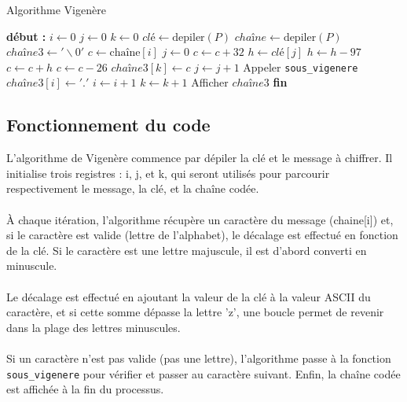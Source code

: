 \documentclass[a4paper, 12pt]{article}
\begin{document}
\begin{algorithm}
\caption{Algorithme Vigenère}
\begin{algorithmic}[1]
\State \textbf{début :}
\State $i \gets 0$
\State $j \gets 0$
\State $k \gets 0$
\State $clé \gets \text{depiler}(P)$
\State $chaîne \gets \text{depiler}(P)$
\State $chaîne3 \gets '\backslash 0'$ 
    \State $c \gets \text{chaîne}[i]$
        \State $j \gets 0$ 
    \EndIf
        \State $c \gets c + 32$ 
    \EndIf
        \State $h \gets clé[j]$
        \State $h \gets h - 97$ 
        \State $c \gets c + h$
            \State $c \gets c - 26$ 
        \EndWhile
        \State $chaîne3[k] \gets c$
        \State $j \gets j + 1$
    \Else
        \State Appeler \texttt{sous\_vigenere}
        \State $chaîne3[i] \gets '.'$
    \EndIf
    \State $i \gets i + 1$
    \State $k \gets k + 1$
\EndWhile
\State Afficher $chaîne3$
\State \textbf{fin}
\end{algorithmic}
\end{algorithm}


\newpage


\subsection{Fonctionnement du code}

L'algorithme de Vigenère commence par dépiler la clé et le message à chiffrer. Il initialise trois registres : i, j, et k, qui seront utilisés pour parcourir respectivement le message, la clé, et la chaîne codée.
\\
\\
À chaque itération, l'algorithme récupère un caractère du message (chaine[i]) et, si le caractère est valide (lettre de l'alphabet), le décalage est effectué en fonction de la clé. Si le caractère est une lettre majuscule, il est d'abord converti en minuscule.
\\
\\
Le décalage est effectué en ajoutant la valeur de la clé à la valeur ASCII du caractère, et si cette somme dépasse la lettre 'z', une boucle permet de revenir dans la plage des lettres minuscules.
\\
\\
Si un caractère n'est pas valide (pas une lettre), l'algorithme passe à la fonction \texttt{sous\_vigenere} pour vérifier et passer au caractère suivant. Enfin, la chaîne codée est affichée à la fin du processus.
\end{document}

